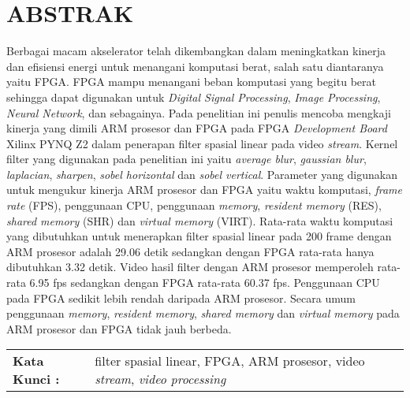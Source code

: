 \chapter*{ABSTRAK}

Berbagai macam akselerator telah dikembangkan dalam meningkatkan kinerja dan efisiensi energi untuk menangani komputasi berat, salah satu diantaranya yaitu FPGA. FPGA mampu menangani beban komputasi yang begitu berat sehingga dapat digunakan untuk \textit{Digital Signal Processing}, \textit{Image Processing}, \textit{Neural Network}, dan sebagainya.
Pada penelitian ini penulis mencoba mengkaji kinerja yang dimili ARM prosesor dan FPGA pada FPGA \textit{Development Board} Xilinx PYNQ Z2 dalam penerapan filter spasial linear pada video \textit{stream}. Kernel filter yang digunakan pada penelitian ini yaitu \textit{average blur}, \textit{gaussian blur}, \textit{laplacian}, \textit{sharpen}, \textit{sobel horizontal} dan \textit{sobel vertical}. Parameter yang digunakan untuk mengukur kinerja ARM prosesor dan FPGA yaitu waktu komputasi, \textit{frame rate} (FPS), penggunaan CPU, penggunaan \textit{memory}, \textit{resident memory} (RES), \textit{shared memory} (SHR) dan \textit{virtual memory} (VIRT).
Rata-rata waktu komputasi yang dibutuhkan untuk menerapkan filter spasial linear pada 200 frame dengan ARM prosesor adalah 29.06 detik sedangkan dengan FPGA rata-rata hanya dibutuhkan 3.32 detik. Video hasil filter dengan ARM prosesor memperoleh rata-rata 6.95 fps sedangkan dengan FPGA rata-rata 60.37 fps. Penggunaan CPU pada FPGA sedikit lebih rendah daripada ARM prosesor. Secara umum penggunaan \textit{memory}, \textit{resident memory}, \textit{shared memory} dan \textit{virtual memory} pada ARM prosesor dan FPGA tidak jauh berbeda.


\begin{table}[h]
    \begin{tabular}{ p{} p{} }
        \\
        \textbf{Kata Kunci :} & filter spasial linear, FPGA, ARM prosesor, video \textit{stream}, \textit{video processing}
    \end{tabular}
\end{table}

 